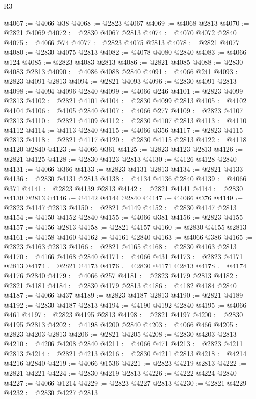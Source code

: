 \begin{lexlean}{R3}
\begin{coremodule}
@4067 := @4066 @38
@4068 := @2823 @4067
@4069 := @4068 @2813
@4070 := @2821 @4069
@4072 := @2830 @4067 @2813
@4074 := @4070 @4072 @2840
@4075 := @4066 @74
@4077 := @2823 @4075 @2813
@4078 := @2821 @4077
@4080 := @2830 @4075 @2813
@4082 := @4078 @4080 @2840
@4083 := @4066 @124
@4085 := @2823 @4083 @2813
@4086 := @2821 @4085
@4088 := @2830 @4083 @2813
@4090 := @4086 @4088 @2840
@4091 := @4066 @241
@4093 := @2823 @4091 @2813
@4094 := @2821 @4093
@4096 := @2830 @4091 @2813
@4098 := @4094 @4096 @2840
@4099 := @4066 @246
@4101 := @2823 @4099 @2813
@4102 := @2821 @4101
@4104 := @2830 @4099 @2813
@4105 := @4102 @4104
@4106 := @4105 @2840
@4107 := @4066 @277
@4109 := @2823 @4107 @2813
@4110 := @2821 @4109
@4112 := @2830 @4107 @2813
@4113 := @4110 @4112
@4114 := @4113 @2840
@4115 := @4066 @356
@4117 := @2823 @4115 @2813
@4118 := @2821 @4117
@4120 := @2830 @4115 @2813
@4122 := @4118 @4120 @2840
@4123 := @4066 @361
@4125 := @2823 @4123 @2813
@4126 := @2821 @4125
@4128 := @2830 @4123 @2813
@4130 := @4126 @4128 @2840
@4131 := @4066 @366
@4133 := @2823 @4131 @2813
@4134 := @2821 @4133
@4136 := @2830 @4131 @2813
@4138 := @4134 @4136 @2840
@4139 := @4066 @371
@4141 := @2823 @4139 @2813
@4142 := @2821 @4141
@4144 := @2830 @4139 @2813
@4146 := @4142 @4144 @2840
@4147 := @4066 @376
@4149 := @2823 @4147 @2813
@4150 := @2821 @4149
@4152 := @2830 @4147 @2813
@4154 := @4150 @4152 @2840
@4155 := @4066 @381
@4156 := @2823 @4155
@4157 := @4156 @2813
@4158 := @2821 @4157
@4160 := @2830 @4155 @2813
@4161 := @4158 @4160
@4162 := @4161 @2840
@4163 := @4066 @386
@4165 := @2823 @4163 @2813
@4166 := @2821 @4165
@4168 := @2830 @4163 @2813
@4170 := @4166 @4168 @2840
@4171 := @4066 @431
@4173 := @2823 @4171 @2813
@4174 := @2821 @4173
@4176 := @2830 @4171 @2813
@4178 := @4174 @4176 @2840
@4179 := @4066 @257
@4181 := @2823 @4179 @2813
@4182 := @2821 @4181
@4184 := @2830 @4179 @2813
@4186 := @4182 @4184 @2840
@4187 := @4066 @437
@4189 := @2823 @4187 @2813
@4190 := @2821 @4189
@4192 := @2830 @4187 @2813
@4194 := @4190 @4192 @2840
@4195 := @4066 @461
@4197 := @2823 @4195 @2813
@4198 := @2821 @4197
@4200 := @2830 @4195 @2813
@4202 := @4198 @4200 @2840
@4203 := @4066 @466
@4205 := @2823 @4203 @2813
@4206 := @2821 @4205
@4208 := @2830 @4203 @2813
@4210 := @4206 @4208 @2840
@4211 := @4066 @471
@4213 := @2823 @4211 @2813
@4214 := @2821 @4213
@4216 := @2830 @4211 @2813
@4218 := @4214 @4216 @2840
@4219 := @4066 @1536
@4221 := @2823 @4219 @2813
@4222 := @2821 @4221
@4224 := @2830 @4219 @2813
@4226 := @4222 @4224 @2840
@4227 := @4066 @1214
@4229 := @2823 @4227 @2813
@4230 := @2821 @4229
@4232 := @2830 @4227 @2813

\end{coremodule}
\end{lexlean}
